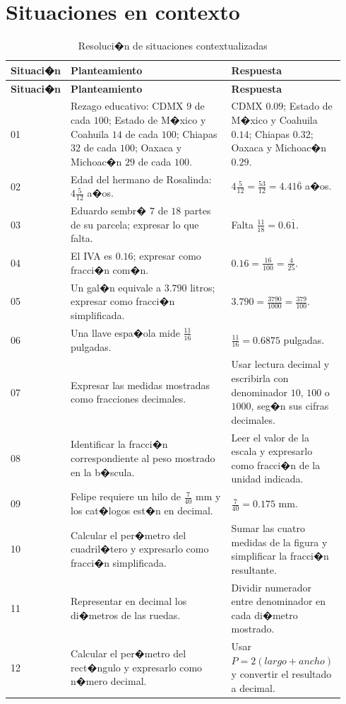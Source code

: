 \documentclass[
	spanish,
	letterpaper, oneside
]{article}
\begin{document}
\section{Situaciones en contexto}

\begin{longtable}{@{}p{0.12\linewidth}p{0.48\linewidth}p{0.34\linewidth}@{}}
	\caption{Resoluci�n de situaciones contextualizadas}\label{tab:situaciones}\\
	\toprule
	\textbf{Situaci�n} & \textbf{Planteamiento} & \textbf{Respuesta} \\
	\midrule
	\endfirsthead
	\toprule
	\textbf{Situaci�n} & \textbf{Planteamiento} & \textbf{Respuesta} \\
	\midrule
	\endhead
	01 & Rezago educativo: CDMX $9$ de cada $100$; Estado de M�xico y Coahuila $14$ de cada $100$; Chiapas $32$ de cada $100$; Oaxaca y Michoac�n $29$ de cada $100$. & CDMX $0{.}09$; Estado de M�xico y Coahuila $0{.}14$; Chiapas $0{.}32$; Oaxaca y Michoac�n $0{.}29$. \\
	02 & Edad del hermano de Rosalinda: $4\frac{5}{12}$ a�os. & $4\frac{5}{12}=\frac{53}{12}=4{.}41\overline{6}$ a�os. \\
	03 & Eduardo sembr� $7$ de $18$ partes de su parcela; expresar lo que falta. & Falta $\frac{11}{18}=0{.}6\overline{1}$. \\
	04 & El IVA es $0{.}16$; expresar como fracci�n com�n. & $0{.}16=\frac{16}{100}=\frac{4}{25}$. \\
	05 & Un gal�n equivale a $3{.}790$ litros; expresar como fracci�n simplificada. & $3{.}790=\frac{3790}{1000}=\frac{379}{100}$. \\
	06 & Una llave espa�ola mide $\frac{11}{16}$ pulgadas. & $\frac{11}{16}=0{.}6875$ pulgadas. \\
	07 & Expresar las medidas mostradas como fracciones decimales. & Usar lectura decimal y escribirla con denominador $10$, $100$ o $1000$, seg�n sus cifras decimales. \\
	08 & Identificar la fracci�n correspondiente al peso mostrado en la b�scula. & Leer el valor de la escala y expresarlo como fracci�n de la unidad indicada. \\
	09 & Felipe requiere un hilo de $\frac{7}{40}$ mm y los cat�logos est�n en decimal. & $\frac{7}{40}=0{.}175$ mm. \\
	10 & Calcular el per�metro del cuadril�tero y expresarlo como fracci�n simplificada. & Sumar las cuatro medidas de la figura y simplificar la fracci�n resultante. \\
	11 & Representar en decimal los di�metros de las ruedas. & Dividir numerador entre denominador en cada di�metro mostrado. \\
	12 & Calcular el per�metro del rect�ngulo y expresarlo como n�mero decimal. & Usar $P=2(largo+ancho)$ y convertir el resultado a decimal. \\
	\bottomrule
\end{longtable}
\end{document}
